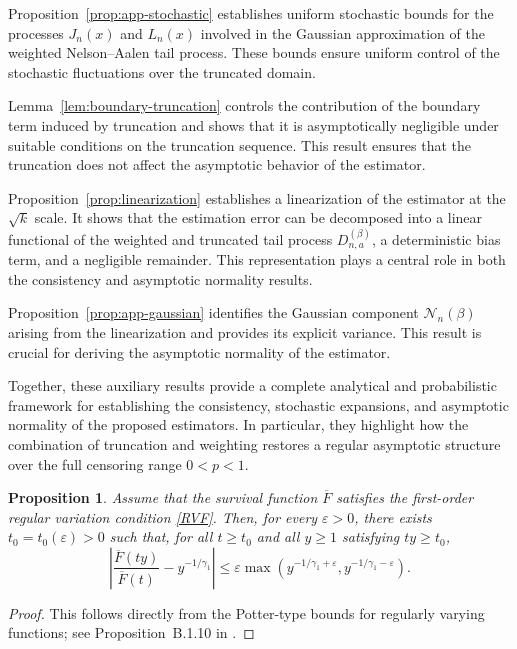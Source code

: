 \documentclass[reqno,openbib,runningheads,a4paper,12pt]{amsart}%
\newtheorem{proposition}{Proposition}[section]
\begin{document}
\noindent Proposition~\ref{prop:app-stochastic} establishes uniform stochastic
bounds for the processes $J_{n}(x)$ and $L_{n}(x)$ involved in the Gaussian
approximation of the weighted Nelson--Aalen tail process. These bounds ensure
uniform control of the stochastic fluctuations over the truncated
domain.\smallskip

\noindent Lemma~\ref{lem:boundary-truncation} controls the contribution of the
boundary term induced by truncation and shows that it is asymptotically
negligible under suitable conditions on the truncation sequence. This result
ensures that the truncation does not affect the asymptotic behavior of the
estimator.\smallskip

\noindent Proposition~\ref{prop:linearization} establishes a linearization of
the estimator at the $\sqrt{k}$ scale. It shows that the estimation error can
be decomposed into a linear functional of the weighted and truncated tail
process $D_{n,a}^{(\beta)}$, a deterministic bias term, and a negligible
remainder. This representation plays a central role in both the consistency
and asymptotic normality results.\smallskip

\noindent Proposition~\ref{prop:app-gaussian} identifies the Gaussian
component $\mathcal{N}_{n}(\beta)$ arising from the linearization and provides
its explicit variance. This result is crucial for deriving the asymptotic
normality of the estimator.\smallskip

\noindent Together, these auxiliary results provide a complete analytical and
probabilistic framework for establishing the consistency, stochastic
expansions, and asymptotic normality of the proposed estimators. In
particular, they highlight how the combination of truncation and weighting
restores a regular asymptotic structure over the full censoring range $0<p<1$.

\begin{proposition}
\label{prop:app-tailratio} Assume that the survival function $\overline{F}$
satisfies the first-order regular variation condition \eqref{RVF}. Then, for
every $\varepsilon>0$, there exists $t_{0}=t_{0}(\varepsilon)>0$ such that,
for all $t\geq t_{0}$ and all $y\geq1$ satisfying $ty\geq t_{0}$,
\[
\left|  \frac{\overline{F}(ty)}{\overline{F}(t)} - y^{-1/\gamma_{1}} \right|
\leq\varepsilon\max\!\left(  y^{-1/\gamma_{1}+\varepsilon}, y^{-1/\gamma
_{1}-\varepsilon} \right)  .
\]

\end{proposition}

\begin{proof}
This follows directly from the Potter-type bounds for regularly varying
functions; see Proposition~B.1.10 in \cite{deHF06}.
\end{proof}
\end{document}
